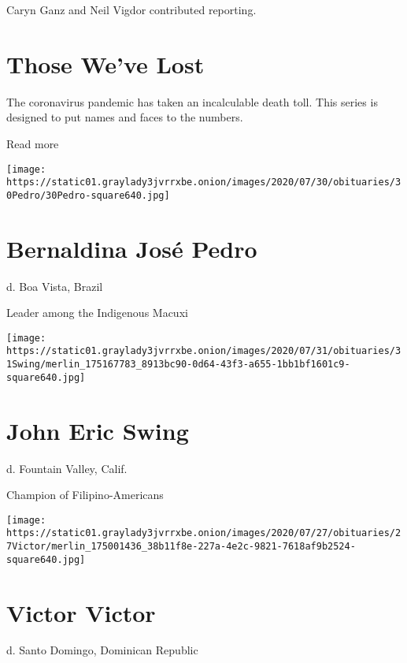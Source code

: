 Caryn Ganz and Neil Vigdor contributed reporting.

\href{https://www.nytimes3xbfgragh.onion/interactive/2020/obituaries/people-died-coronavirus-obituaries.html?action=click\&pgtype=Article\&state=default\&region=BELOW_MAIN_CONTENT\&context=covid_obits_promo}{}

\hypertarget{those-weve-lost}{%
\section{Those We've Lost}\label{those-weve-lost}}

The coronavirus pandemic has taken an incalculable death toll. This
series is designed to put names and faces to the numbers.

Read more

\texttt{[image: https://static01.graylady3jvrrxbe.onion/images/2020/07/30/obituaries/30Pedro/30Pedro-square640.jpg]}

\hypertarget{bernaldina-josuxe9-pedro}{%
\section{Bernaldina José Pedro}\label{bernaldina-josuxe9-pedro}}

d. Boa Vista, Brazil

Leader among the Indigenous Macuxi

\texttt{[image: https://static01.graylady3jvrrxbe.onion/images/2020/07/31/obituaries/31Swing/merlin\_175167783\_8913bc90-0d64-43f3-a655-1bb1bf1601c9-square640.jpg]}

\hypertarget{john-eric-swing}{%
\section{John Eric Swing}\label{john-eric-swing}}

d. Fountain Valley, Calif.

Champion of Filipino-Americans

\texttt{[image: https://static01.graylady3jvrrxbe.onion/images/2020/07/27/obituaries/27Victor/merlin\_175001436\_38b11f8e-227a-4e2c-9821-7618af9b2524-square640.jpg]}

\hypertarget{victor-victor}{%
\section{Victor Victor}\label{victor-victor}}

d. Santo Domingo, Dominican Republic

